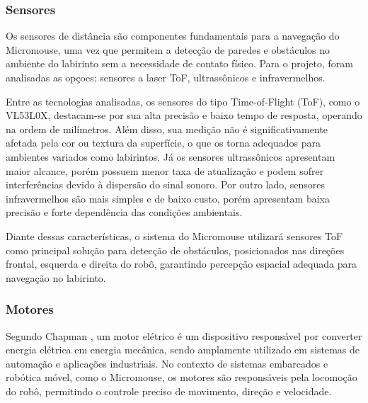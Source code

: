 \subsubsection{Sensores}

Os sensores de distância são componentes fundamentais para a navegação do Micromouse, uma vez que permitem a detecção de paredes e obstáculos no ambiente do labirinto sem a necessidade de contato físico. Para o projeto, foram analisadas as opçoes: sensores a laser ToF, ultrassônicos e infravermelhos.


Entre as tecnologias analisadas, os sensores do tipo Time-of-Flight (ToF), como o VL53L0X, destacam-se por sua alta precisão e baixo tempo de resposta, operando na ordem de milímetros. Além disso, sua medição não é significativamente afetada pela cor ou textura da superfície, o que os torna adequados para ambientes variados como labirintos. Já os sensores ultrassônicos apresentam maior alcance, porém possuem menor taxa de atualização e podem sofrer interferências devido à dispersão do sinal sonoro. Por outro lado, sensores infravermelhos são mais simples e de baixo custo, porém apresentam baixa precisão e forte dependência das condições ambientais.

Diante dessas características, o sistema do Micromouse utilizará sensores ToF como principal solução para detecção de obstáculos, posicionados nas direções frontal, esquerda e direita do robô, garantindo percepção espacial adequada para navegação no labirinto.

\subsubsection{Motores}

Segundo Chapman \cite{chapman_machines}, um motor elétrico é um dispositivo responsável por converter energia elétrica em energia mecânica, sendo amplamente utilizado em sistemas de automação e aplicações industriais. No contexto de sistemas embarcados e robótica móvel, como o Micromouse, os motores são responsáveis pela locomoção do robô, permitindo o controle preciso de movimento, direção e velocidade.

